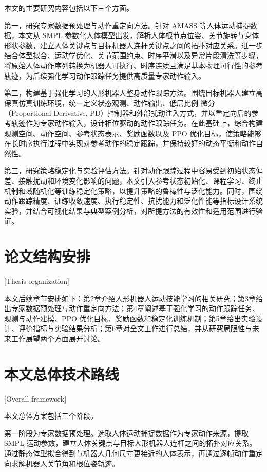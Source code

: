 本文的主要研究内容包括以下三个方面。

第一，研究专家数据预处理与动作重定向方法。针对 AMASS 等人体运动捕捉数据，本文从 SMPL 参数化人体模型出发，解析人体根节点位姿、关节旋转与身体形状参数，建立人体关键点与目标机器人连杆关键点之间的拓扑对应关系。进一步结合体型拟合、运动学优化、关节范围约束、时序平滑以及异常片段清洗等步骤，将原始人体动作序列转换为机器人可执行、时序连续且满足基本物理可行性的参考轨迹，为后续强化学习动作跟踪任务提供高质量专家动作输入。

第二，构建基于强化学习的人形机器人整身动作跟踪方法。围绕目标机器人建立高保真仿真训练环境，统一定义状态观测、动作输出、低层比例-微分（Proportional-Derivative, PD）控制器和外部扰动注入方式，并以重定向后的参考轨迹作为专家动作输入，设计相位驱动的动作跟踪任务。在此基础上，综合构建观测空间、动作空间、参考状态表示、奖励函数以及 PPO 优化目标，使策略能够在长时序执行过程中实现对参考动作的稳定跟踪，并保持较好的动态平衡和动作自然性\cite{isaacgym2021}。

第三，研究策略稳定化与实验评估方法。针对动作跟踪过程中容易受到初始状态偏差、接触扰动和环境变化影响的问题，本文引入参考状态初始化、课程学习、终止机制和域随机化等训练稳定化策略，以提升策略的鲁棒性与泛化能力。同时，围绕动作跟踪精度、训练收敛速度、执行稳定性、抗扰能力和泛化性能等指标设计系统实验，并结合可视化结果与典型案例分析，对所提方法的有效性和适用范围进行验证。

\section{论文结构安排}[Thesis organization]

本文后续章节安排如下：第2章介绍人形机器人运动技能学习的相关研究；第3章给出专家数据预处理与动作重定向方法；第4章阐述基于强化学习的动作跟踪任务、观测与动作建模、PPO 优化目标、奖励函数和稳定化训练机制；第5章给出实验设计、评价指标与实验结果分析；第6章对全文工作进行总结，并从研究局限性与未来工作展望两个方面展开讨论。

\section{本文总体技术路线}[Overall framework]

本文总体方案包括三个阶段。

第一阶段为专家数据预处理。选取人体运动捕捉数据作为专家动作来源，提取 SMPL 运动参数，建立人体关键点与目标人形机器人连杆之间的拓扑对应关系\cite{he2024learning}。通过静态体型拟合得到与机器人几何尺寸更接近的人体表示，再通过逐帧动作重定向求解机器人关节角和根位姿轨迹。

